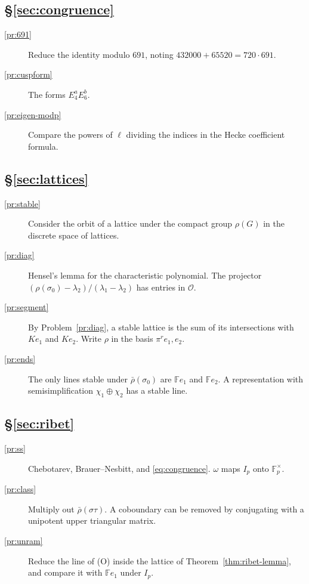 \documentclass[reqno]{amsart}
\theoremstyle{definition}
\theoremstyle{plain}
\newcommand{\F}{\mathbb{F}}
\newcommand{\Oc}{\mathcal{O}}
\begin{document}
\subsection*{\S\ref{sec:congruence}}
\begin{description}
\item[\ref{pr:691}] Reduce the identity modulo \(691\), noting \(432000 + 65520 = 720 \cdot 691\).
\item[\ref{pr:cuspform}] The forms \(E_4^a E_6^b\).
\item[\ref{pr:eigen-modp}] Compare the powers of \(\ell\) dividing the indices in the Hecke coefficient formula.
\end{description}

\subsection*{\S\ref{sec:lattices}}
\begin{description}
\item[\ref{pr:stable}] Consider the orbit of a lattice under the compact group \(\rho(G)\) in the discrete space of lattices.
\item[\ref{pr:diag}] Hensel's lemma for the characteristic polynomial.  The projector \((\rho(\sigma_0) - \lambda_2)/(\lambda_1 - \lambda_2)\) has entries in \(\Oc\).
\item[\ref{pr:segment}] By Problem~\ref{pr:diag}, a stable lattice is the sum of its intersections with \(Ke_1\) and \(Ke_2\).  Write \(\rho\) in the basis \(\pi^r e_1, e_2\).
\item[\ref{pr:ends}] The only lines stable under \(\bar\rho(\sigma_0)\) are \(\F e_1\) and \(\F e_2\).  A representation with semisimplification \(\chi_1 \oplus \chi_2\) has a stable line.
\end{description}

\subsection*{\S\ref{sec:ribet}}
\begin{description}
\item[\ref{pr:ss}] Chebotarev, Brauer--Nesbitt, and \eqref{eq:congruence}.  \(\omega\) maps \(I_p\) onto \(\F_p^\times\).
\item[\ref{pr:class}] Multiply out \(\bar\rho(\sigma\tau)\).  A coboundary can be removed by conjugating with a unipotent upper triangular matrix.
\item[\ref{pr:unram}] Reduce the line of (O) inside the lattice of Theorem~\ref{thm:ribet-lemma}, and compare it with \(\F e_1\) under \(I_p\).
\end{description}
\end{document}
